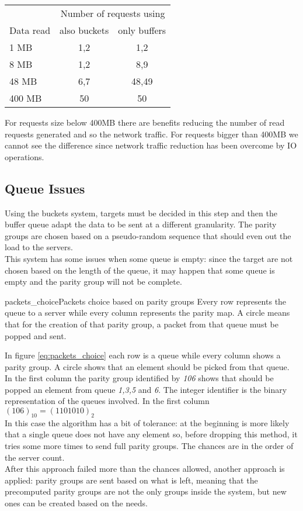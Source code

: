 \vspace{0.5cm}
\begin{tabular}{l | c | c}
    & \multicolumn{2}{|c}{Number of requests using} \\
    Data read & also buckets & only buffers \\ \hline
    1 MB & 1,2 & 1,2 \\
    8 MB & 1,2 & 8,9 \\
    48 MB& 6,7 & 48,49 \\
    400 MB & 50 & 50 \\
\end{tabular}
\vspace{0.5cm}

For requests size below 400MB there are benefits reducing the number of read
requests generated and so the network traffic. For requests bigger than 400MB
we cannot see the difference since network traffic reduction has been overcome
by IO operations.

\subsection{Queue Issues}
Using the buckets system, targets must be decided in this step and then the
buffer queue adapt the data to be sent at a different granularity.
The parity groups are chosen based on a pseudo-random sequence that should
even out the load to the servers. \\
This system has some issues when some queue is empty: since the target are
not chosen based on the length of the queue, it may happen that some queue is
empty and the parity group will not be complete. \\

\begin{myimage}{packets_choice}{Packets choice based on parity groups}
    Every row represents the queue to a server while every column represents the
    parity map. A circle means that for the creation of that parity group, a
    packet from that queue must be popped and sent.
\end{myimage}
In figure \ref{eq:packets_choice} each row is a queue while every column shows a parity group.
A circle shows that an element should be picked from that queue. \\
In the first column the parity group identified by \textit{106} shows that
should be popped an element from queue \textit{1,3,5} and \textit{6}. The
integer identifier is the binary representation of the queues involved. In the
first column $(106)_{10} = (1101010)_2$ \\
In this case the algorithm has a bit of tolerance: at the beginning is more
likely that a single queue does not have any element so, before dropping this
method, it tries some more times to send full parity groups. The chances are in
the order of the server count. \\
After this approach failed more than the chances allowed, another approach is applied:
parity groups are sent based on what is left, meaning that the precomputed
parity groups are not the only groups inside the system, but new ones can be
created based on the needs.\\

